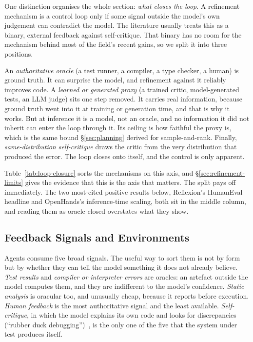 \documentclass[
  english,        %
  font=times,     %
  twocolumn,      %
]{tumarticle}
\begin{document}
One distinction organises the whole section: \emph{what closes the loop}. A
refinement mechanism is a control loop only if some signal outside the model's own
judgement can contradict the model. The literature usually treats this as a
binary, external feedback against self-critique. That binary has no room for the
mechanism behind most of the field's recent gains, so we split it into three
positions.

An \emph{authoritative oracle} (a test runner, a compiler, a type checker, a
human) is ground truth. It can surprise the model, and refinement against it
reliably improves code. A \emph{learned or generated proxy} (a trained critic,
model-generated tests, an LLM judge) sits one step removed. It carries real
information, because ground truth went into it at training or generation time, and
that is why it works. But at inference it is a model, not an oracle, and no
information it did not inherit can enter the loop through it. Its ceiling is how faithful the proxy is, which is the same
bound \S\ref{sec:planning} derived for sample-and-rank. Finally,
\emph{same-distribution self-critique} draws the critic from the very distribution
that produced the error. The loop closes onto itself, and the control is only
apparent.

Table~\ref{tab:loop-closure} sorts the mechanisms on this axis, and
\S\ref{sec:refinement-limits} gives the evidence that this is the axis that
matters. The split pays off immediately. The two most-cited positive results
below, Reflexion's HumanEval headline and OpenHands's inference-time scaling, both
sit in the middle column, and reading them as oracle-closed overstates what they
show.

\subsection{Feedback Signals and Environments}
\label{sec:feedback-signals}

Agents consume five broad signals. The useful way to sort them is not by form but
by whether they can tell the model something it does not already believe.
\emph{Test results} and \emph{compiler or interpreter errors} are oracles: an
artefact outside the model computes them, and they are indifferent to the model's
confidence. \emph{Static analysis} is oracular too, and unusually cheap, because
it reports before execution. \emph{Human feedback} is the most authoritative
signal and the least available. \emph{Self-critique}, in which the model explains
its own code and looks for discrepancies (``rubber duck
debugging'')~\cite{chen2024selfdebug}, is the only one of the five that the system
under test produces itself.
\end{document}
